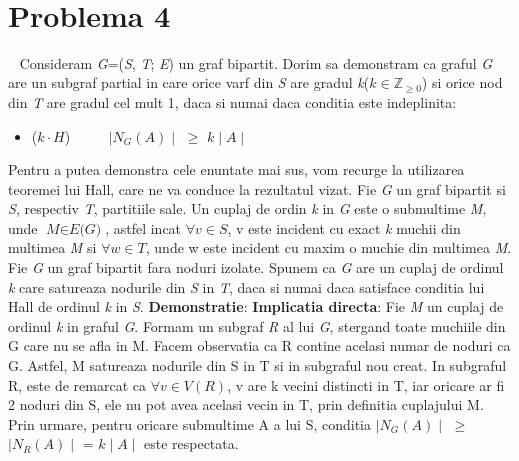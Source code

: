 \documentclass{article}
\begin{document}
\
\section{Problema 4}
\   
\newline
Consideram \textit{G}=(\textit{S}, \textit{T}; \textit{E}) un graf bipartit. Dorim sa demonstram ca graful \textit{G} are un subgraf partial in care orice varf din \textit{S} are gradul \textit{k}($k \in  \mathbb{Z}_{\geq 0}$) si orice nod din \textit{T} are gradul cel mult 1, daca si numai daca conditia este indeplinita: 
\begin{center}
\begin{itemize}
\item	($k \cdot H$) $\hspace{25pt}$ $\mid N_G(A)\mid$ $\geq$ $k \mid A\mid$
\end{itemize}
\end{center}
Pentru a putea demonstra cele enuntate mai sus, vom recurge la utilizarea teoremei lui Hall, care ne va conduce la rezultatul vizat.
\newline
\newline
Fie \textit{G} un graf bipartit si \textit{S}, respectiv \textit{T}, partitiile sale. Un cuplaj de ordin \textit{k} in \textit{G} este o submultime \textit{M}, unde $\textit{M} \in \textit{E(G)}$, astfel incat $\forall v \in S$, v este incident cu exact \textit{k} muchii din multimea \textit{M} si $\forall w \in T$, unde  w este incident cu maxim o muchie din multimea \textit{M}. 
Fie \textit{G} un graf bipartit fara noduri izolate. Spunem ca \textit{G} are un cuplaj de ordinul \textit{k} care satureaza nodurile din \textit{S} in \textit{T}, daca si numai daca satisface conditia lui Hall de ordinul \textit{k} in \textit{S}.
\newline
\newline
\textbf{Demonstratie}:
\newline
\newline
\textbf{Implicatia directa}: Fie \textit{M} un cuplaj de ordinul \textit{k} in graful \textit{G}. Formam un subgraf \textit{R} al lui \textit{G}, stergand toate muchiile din G care nu se afla in M. Facem observatia ca R contine acelasi numar de noduri ca G. Astfel, M satureaza nodurile din S in T si in subgraful nou creat. In subgraful R, este de remarcat ca $\forall v \in V(R)$, v are k vecini distincti in T, iar oricare ar fi 2 noduri din S, ele nu pot avea acelasi vecin in T, prin definitia cuplajului M. Prin urmare, pentru oricare submultime A a lui S, conditia $\mid N_G(A)\mid$ $\geq$ $\mid N_R(A)\mid$ = $k \mid A\mid$ este respectata.
\end{document}
